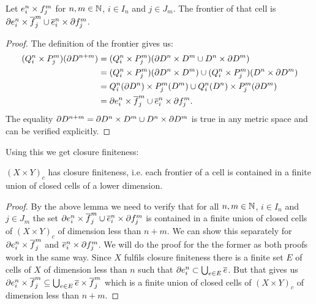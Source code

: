 \begin{lem}
    Let $\openCell{n}{i} \times \openCellf{m}{j}$ for $n, m \in \bN$, $i \in I_n$ and $j \in J_m$. 
    The frontier of that cell is $\cellFrontier{n}{i} \times \closedCellf{m}{j} \cup \closedCell{n}{i} \times \cellFrontierf{m}{j}$.
\end{lem}
\begin{proof}
    The definition of the frontier gives us: 
    \begin{equation*}
        \begin{split}
            (Q_i^n \times P_j^m) (\boundary D^{n + m}) &=  (Q_i^n \times P_j^m) (\boundary D^n \times D^m \cup D^n \times \boundary D^m) \\
            &= (Q_i^n \times P_j^m) (\boundary D^n \times D^m) \cup (Q_i^n \times P_j^m) (D^n \times \boundary D^m) \\
            &= Q_i^n(\boundary D^n) \times P_j^m(D^m) \cup Q_i^n (D^n) \times P_j^m (\boundary D^m) \\
            &= \cellFrontier{n}{i} \times \closedCellf{m}{j} \cup \closedCell{n}{i} \times \cellFrontierf{m}{j}.
        \end{split}
    \end{equation*}
    The equality $\boundary D^{n + m} = \boundary D^n \times D^m \cup D^n \times \boundary D^m$ is true in any metric space and can be verified explicitly.
\end{proof}

Using this we get closure finiteness:

\begin{lem}\label{lem:closurefiniteproduct}
    $(X \times Y)_c$ has closure finiteness, i.e. each frontier of a cell is contained in a finite union of closed cells of a lower dimension.
\end{lem}
\begin{proof}
    By the above lemma we need to verify that for all $n, m \in \bN$, $i \in I_n$ and $j \in J_m$ the set $\cellFrontier{n}{i} \times \closedCellf{m}{j} \cup \closedCell{n}{i} \times \cellFrontierf{m}{j}$ is contained in a finite union of closed cells of $(X \times Y)_c$ of dimension less than $n + m$. 
    We can show this separately for $\cellFrontier{n}{i} \times \closedCellf{m}{j}$ and $\closedCell{n}{i} \times \cellFrontierf{m}{j}$. 
    We will do the proof for the the former as both proofs work in the same way. 
    Since $X$ fulfils closure finiteness there is a finite set $E$ of cells of $X$ of dimension less than $n$ such that $\cellFrontier{n}{i} \subset \bigcup_{e \in E}\closure{e}$. 
    But that gives us $\cellFrontier{n}{i} \times \closedCellf{m}{j} \subseteq \bigcup_{e \in E}\closure{e} \times \closedCellf{m}{j}$ which is a finite union of closed cells of $(X \times Y)_c$ of dimension less than $n + m$.
\end{proof}

